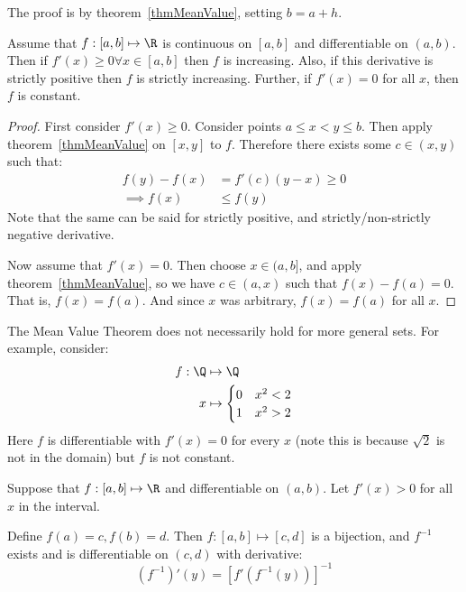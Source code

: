\documentclass[../Main.tex]{subfiles}
\begin{document}
The proof is by theorem~\ref{thmMeanValue}, setting $b = a + h$.
\begin{corollary}
    Assume that $f : [a, b] \mapsto \R$ is continuous on $[a, b]$ and differentiable on $(a, b)$. Then if $f'(x) \geq 0 \forall x \in [a, b]$ then $f$ is increasing. Also, if this derivative is strictly positive then $f$ is strictly increasing. Further, if $f'(x) = 0$ for all $x$, then $f$ is constant.
    \label{corDerivativeSign}
\end{corollary}
\begin{proof}
    First consider $f'(x) \geq 0$. Consider points $a \leq x < y \leq b$. Then apply theorem~\ref{thmMeanValue} on $[x, y]$ to $f$. Therefore there exists some $c \in (x, y)$ such that:
    \begin{align*}
        f(y) - f(x) &= f'(c)(y-x) \geq 0 \\
        \implies f(x) &\leq f(y)
    \end{align*}
    Note that the same can be said for strictly positive, and strictly/non-strictly negative derivative.\par
    Now assume that $f'(x) = 0$. Then choose $x \in (a, b]$, and apply theorem~\ref{thmMeanValue}, so we have $c \in (a, x)$ such that $f(x) - f(a) = 0$. That is, $f(x) = f(a)$. And since $x$ was arbitrary, $f(x) = f(a)$ for all $x$.
\end{proof}
\begin{warning}
    The Mean Value Theorem does not necessarily hold for more general sets. For example, consider:
    \begin{align*}
        f : \Q &\mapsto \Q \\
        x &\mapsto
        \begin{cases}
            0 & x^2 < 2 \\
            1 & x^2 > 2
        \end{cases}
    \end{align*}
    Here $f$ is differentiable with $f'(x) = 0$ for every $x$ (note this is because $\sqrt{2}$ is not in the domain) but $f$ is not constant.
\end{warning}
\begin{theorem}
    Suppose that $f : [a, b] \mapsto \R$ and differentiable on $(a, b)$. Let $f'(x) > 0$ for all $x$ in the interval.\par
    Define $f(a) = c, f(b) = d$. Then $f : [a, b] \mapsto [c, d]$ is a bijection, and $f^{-1}$ exists and is differentiable on $(c, d)$ with derivative:
    \begin{equation*}
        (f^{-1})'(y) = \left[f'(f^{-1}(y))\right]^{-1}
    \end{equation*}
    \label{thmInverseFunctionII}
\end{theorem}
\end{document}
